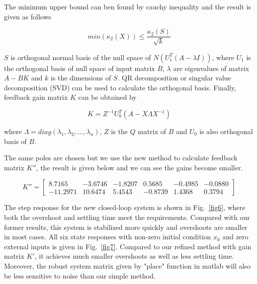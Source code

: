 \documentclass[hyperref]{article}
\theoremstyle{nonumberplain}
\begin{document}
	The minimum upper bound can ben found by cauchy inequality and the result is given as follows
	
	\begin{equation}
	min ( \kappa _{2}(X)) \leq \frac{\kappa _{2}(S)}{\sqrt{k}}
	\label{eq17}
	\end{equation}
	
	$S$ is orthogonal normal basis of the null space of $N(U_{1}^{T}(A-\lambda I))$, where $U_{1}$ is the orthogonal basis of null space of input matrix $B$, $\lambda$ are eigenvalues of matrix $A-BK$ and $k$ is the dimensions of $S$. QR decomposition or singular value decomposition (SVD) can be used to calculate the orthogonal basis. Finally, feedback gain matrix $K$ can be obtained by
	
	\begin{equation}
	K=Z^{-1}U_{0}^{T}(A-X\Lambda X^{-1})
	\label{eq18}
	\end{equation}
	
	where $\Lambda=diag(\lambda_{1},\lambda_{2},...,\lambda_{n})$, $Z$ is the $Q$ matrix of $B$ and $U_{0}$ is also orthogonal basis of $B$.
	
	The same poles are chosen but we use the new method to calculate feedback matrix ${K}''$, the result is given below and we can see the gains become smaller.
	
	\begin{equation}
	{K}''=\begin{bmatrix}
	8.7165 &-3.6746  &-1.8207  &0.5685  &-0.4985  &-0.0880 \\ 
	-11.2971 &10.6474  &5.4543  &-0.8739  &1.4368  &0.3794 
	\end{bmatrix}
	\nonumber
	\end{equation}
	
	The step response for the new closed-loop system is shown in Fig.~\ref{fig6}, where both the overshoot and settling time meet the requirements. Compared with our former results, this system is stabilized more quickly and overshoots are smaller in most cases. All six state responses with non-zero initial condition $x_{0}$ and zero external inputs is given in Fig.~\ref{fig7}. Compared to our refined method with gain matrix ${K}'$, it achieves much smaller overshoots as well as less settling time. Moreover, the robust system matrix given by "place" function in matlab will also be less sensitive to noise than our simple method. 
	
\end{document}
